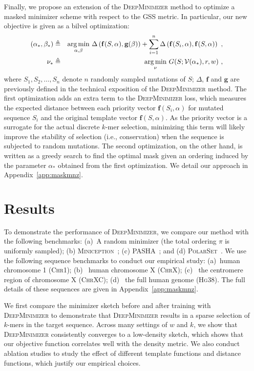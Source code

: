 Finally, we propose an extension of the \textsc{DeepMinimizer} method to optimize a masked minimizer scheme with respect to the GSS metric. In particular, our new objective is given as a bilvel optimization:
\begin{eqnarray}
(\alpha_\ast,\beta_\ast) &\triangleq& \underset{\alpha, \beta}{\argmin} \ \Delta\left(\mathbf{f}(S,\alpha),\mathbf{g}(\beta)\right) + \sum_{i=1}^n \Delta\left(\mathbf{f}(S_i,\alpha),\mathbf{f}(S, \alpha)\right) \ , \nonumber \\
\quad \nu_\ast &\triangleq& \underset{\nu}{\argmin} \ G(S; \mathcal{V}(\alpha_\ast), r, w) \ ,
\end{eqnarray}
where $S_1, S_2, \dots, S_n$ denote $n$ randomly sampled mutations of $S$; $\Delta$, $\mathbf{f}$ and $\mathbf{g}$ are previously defined in the technical exposition of the \textsc{DeepMinimizer} method. The first optimization adds an extra term to the \textsc{DeepMinimizer} loss, which measures the expected distance between each priority vector $\mathbf{f}(S_i,\alpha)$ for mutated sequence $S_i$ and the original template vector $\mathbf{f}(S,\alpha)$. As the priority vector is a surrogate for the actual discrete $k$-mer selection, minimizing this term will likely improve the stability of selection (i.e., conservation) when the sequence is subjected to random mutations. The second optimization, on the other hand, is written as a greedy search to find the optimal mask given an ordering induced by the parameter $\alpha_\ast$ obtained from the first optimization. We detail our approach in Appendix~\ref{app:maskmnz}.

\section{Results}
To demonstrate the performance of \textsc{DeepMinimizer}, we compare our method with the following benchmarks: (a)~A random minimizer (the total ordering $\pi$ is uniformly sampled); (b) \textsc{Miniception}~\cite{zheng20miniception}; (c) \textsc{PASHA}~\cite{ekim20pasha}; and (d) \textsc{PolarSet}~\cite{zheng21}. We use the following sequence benchmarks to conduct our empirical study: (a)~human chromosome 1 (\textsc{Chr1}); (b) ~human chromosome X (\textsc{ChrX}); (c) ~the centromere region of chromosome X (\textsc{ChrXC}); (d) ~the full human genome (\textsc{Hg38}). The full details of these sequences are given in Appendix~\ref{app:maskmnz}.

We first compare the minimizer sketch before and after training with \textsc{DeepMinimizer} to demonstrate that \textsc{DeepMinimizer} results in a sparse selection of $k$-mers in the target sequence. Across many settings of $w$ and $k$, we show that \textsc{DeepMinimizer} consistently converges to a low-density sketch, which shows that our objective function correlates well with the density metric. We also conduct ablation studies to study the effect of different template functions and distance functions, which justify our empirical choices. 

